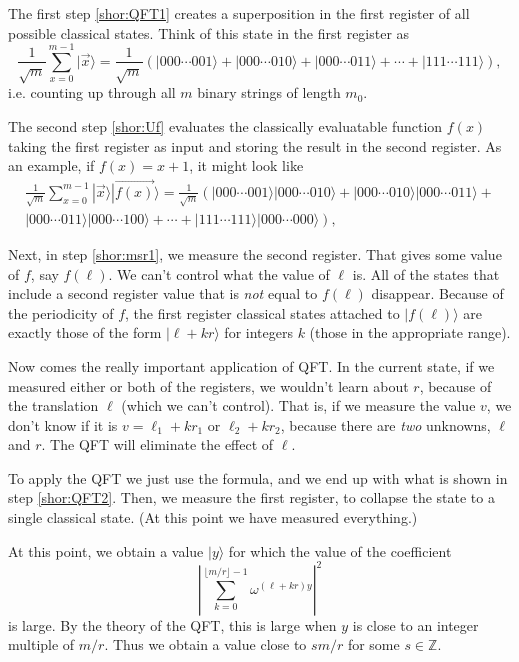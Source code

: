 \documentclass{article}
\theoremstyle{plain}
\theoremstyle{definition}
\theoremstyle{remark}
\numberwithin{theorem}{section}
\newcommand{\ZZ}{\mathbb{Z}}
\begin{document}
The first step \eqref{shor:QFT1} creates a superposition in the first register of all possible classical states.  Think of this state in the first register as
\[
 \frac{1}{\sqrt{m}}
     \sum_{x=0}^{m-1} | \vec{x} \rangle =
     \frac{1}{\sqrt{m}} \left(
|000\cdots 001 \rangle +
|000\cdots 010 \rangle +
|000\cdots 011 \rangle +
\cdots +
|111\cdots 111 \rangle \right),
\]
i.e. counting up through all $m$ binary strings of length $m_0$.

The second step \eqref{shor:Uf} evaluates the classically evaluatable function $f(x)$ taking the first register as input and storing the result in the second register.  As an example, if $f(x) = x+1$, it might look like
\begin{multline*}
 \frac{1}{\sqrt{m}}
     \sum_{x=0}^{m-1} | \vec{x} \rangle | \vec{f(x)} \rangle  =
     \frac{1}{\sqrt{m}} \left(
|000\cdots 001 \rangle |000\cdots 010 \rangle +
|000\cdots 010 \rangle |000\cdots 011 \rangle + 
\right.\\ \left.
|000\cdots 011 \rangle |000\cdots 100 \rangle +
\cdots +
|111\cdots 111 \rangle |000\cdots 000 \rangle 
\right),
\end{multline*}

Next, in step \eqref{shor:msr1}, we measure the second register.  That gives some value of $f$, say $f(\ell)$.  We can't control what the value of $\ell$ is.  All of the states that include a second register value that is \emph{not} equal to $f(\ell)$ disappear.  Because of the periodicity of $f$, the first register classical states attached to $|f(\ell)\rangle$ are exactly those of the form $| \ell + kr \rangle$ for integers $k$ (those in the appropriate range).

Now comes the really important application of QFT.  In the current state, if we measured either or both of the registers, we wouldn't learn about $r$, because of the translation $\ell$ (which we can't control).  That is, if we measure the value $v$, we don't know if it is $v = \ell_1 + k r_1$ or $\ell_2 + k r_2$, because there are \emph{two} unknowns, $\ell$ and $r$.  The QFT will eliminate the effect of $\ell$.

To apply the QFT we just use the formula, and we end up with what is shown in step \eqref{shor:QFT2}.  Then, we measure the first register, to collapse the state to a single classical state.  (At this point we have measured everything.)

At this point, we obtain a value $| y \rangle$ for which the value of the coefficient 
\[
\left| 
     \sum_{k=0}^{\lfloor m/r \rfloor -1}  \omega^{(\ell + kr)y} \right|^2
     \]
     is large.  By the theory of the QFT, this is large when $y$ is close to an integer multiple of $m/r$.  Thus we obtain a value close to $sm/r$ for some $s \in \ZZ$.
\end{document}
